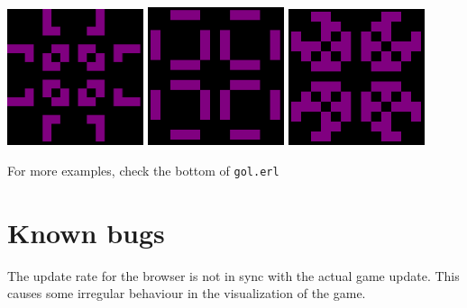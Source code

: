 \documentclass[a4paper,11pt]{article}
\begin{document}
\includegraphics[width=0.3\textwidth]{img/pulsar3.png}
\includegraphics[width=0.3\textwidth]{img/pulsar2.png}
\includegraphics[width=0.3\textwidth]{img/pulsar1.png}


\noindent For more examples, check the bottom of \texttt{gol.erl}


\section{Known bugs}
The update rate for the browser is not in sync with the actual game update. This causes some irregular behaviour in the visualization of the game.
\end{document}
